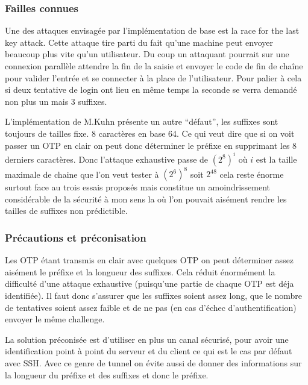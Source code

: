 \documentclass{../res/univ-projet}
\begin{document}
\subsubsection{Failles connues} 
        Une des attaques envisagée par l'implémentation de base est la race for the last key attack.
    Cette attaque tire parti du fait qu'une machine peut envoyer beaucoup plus vite qu'un utilisateur.
    Du coup un attaquant pourrait sur une connexion parallèle attendre la fin de la saisie et envoyer
    le code de fin de chaîne pour valider l'entrée et se connecter à la place de l'utilisateur.
    Pour palier à cela si deux tentative de login ont lieu en même temps la seconde se verra demandé
    non plus un mais 3 suffixes.

        L'implémentation de M.Kuhn présente un autre ``défaut'', les suffixes sont toujours de tailles fixe.
    8 caractères en base 64. Ce qui veut dire que si on voit passer un OTP en clair on peut donc déterminer le
    préfixe en supprimant les 8 derniers caractères. Donc l'attaque exhaustive passe de $(2^8)^i$ où $i$ est
    la taille maximale de chaine que l'on veut tester à $(2^6)^8$ soit $2^48$ cela reste énorme surtout
    face au trois essais proposés mais constitue un amoindrissement considérable de la sécurité à mon sens
    la où l'on pouvait aisément rendre les tailles de suffixes non prédictible.

\subsubsection{Précautions et préconisation}
        Les OTP étant transmis en clair avec quelques OTP on peut déterminer assez
    aisément le préfixe et la longueur des suffixes. Cela réduit énormément la
    difficulté d'une attaque exhaustive (puisqu'une partie de chaque OTP est déja identifiée).
    Il faut donc s'assurer que les suffixes soient assez long, que le nombre de tentatives 
    soient assez faible et de ne pas (en cas d'échec d'authentification) envoyer le même challenge.


        La solution préconisée est d'utiliser en plus un canal sécurisé, pour avoir une 
    identification point à point du serveur et du client ce qui est le cas par défaut avec
    SSH. Avec ce genre de tunnel on évite aussi de donner des informations sur la longueur du préfixe
    et des suffixes et donc le préfixe. %
\end{document}
